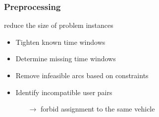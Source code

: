 \documentclass[aspectratio=1610]{beamer}
\let\oldfootnotesize\footnotesize
\renewcommand*{\footnotesize}{\oldfootnotesize\fontsize{6}{4}\selectfont}
\renewcommand{\footnotesize}{\scriptsize}
\begin{document}
\begin{frame}[noframenumbering]
  \frametitle{Preprocessing}
  
 reduce the size of problem instances

\bigskip

 {\footnotesize{\textcolor{gray}{\cite{Su:2023}}}}
\smallskip
\begin{itemize}
	\item Tighten known time windows
	\item Determine missing time windows  
\end{itemize}

\bigskip

 {\footnotesize{\textcolor{gray}{\cite{Goeke:2019,Dumas:1991,Cordeau:2006}}}} %
\smallskip
\begin{itemize}
	\item Remove infeasible arcs based on constraints 
	\item Identify incompatible user pairs 
		\begin{itemize}
			\item[$\rightarrow$] forbid assignment to the same vehicle 
		\end{itemize}
\end{itemize}

%

\end{frame}
\end{document}
